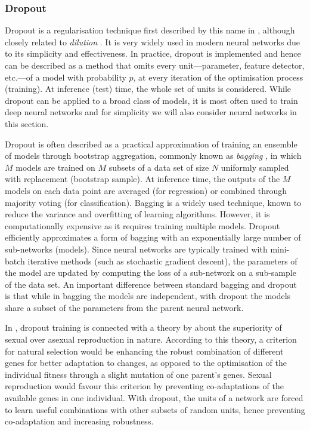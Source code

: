 {\subsubsection{Dropout}
\label{sec:background-dropout}
Dropout is a regularisation technique first described by this name in \citep{hinton2012dropout, srivastava2014dropout}, although closely related to \textit{dilution} \citep{hertz1991dilution}. It is very widely used in modern neural networks due to its simplicity and effectiveness. In practice, dropout is implemented and hence can be described as a method that omits every unit---parameter, feature detector, etc.---of a model with probability $p$, at every iteration of the optimisation process (training). At inference (test) time, the whole set of units is considered. While dropout can be applied to a broad class of models, it is most often used to train deep neural networks and for simplicity we will also consider neural networks in this section.

Dropout is often described as a practical approximation of training an ensemble of models through bootstrap aggregation, commonly known as \textit{bagging} \citep{breiman1994bagging}, in which $M$ models are trained on $M$ subsets of a data set of size $N$ uniformly sampled with replacement (bootstrap sample). At inference time, the outputs of the $M$ models on each data point are averaged (for regression) or combined through majority voting (for classification). Bagging is a widely used technique, known to reduce the variance and overfitting of learning algorithms. However, it is computationally expensive as it requires training multiple models. Dropout efficiently approximates a form of bagging with an exponentially large number of sub-networks (models). Since neural networks are typically trained with mini-batch iterative methods (such as stochastic gradient descent), the parameters of the model are updated by computing the loss of a sub-network on a sub-sample of the data set. An important difference between standard bagging and dropout is that while in bagging the models are independent, with dropout the models share a subset of the parameters from the parent neural network.

In \citep{srivastava2014dropout}, dropout training is connected with a theory by \citet{livnat2010sex} about the superiority of sexual over asexual reproduction in nature. According to this theory, a criterion for natural selection would be enhancing the robust combination of different genes for better adaptation to changes, as opposed to the optimisation of the individual fitness through a slight mutation of one parent's genes. Sexual reproduction would favour this criterion by preventing co-adaptations of the available genes in one individual. With dropout, the units of a network are forced to learn useful combinations with other subsets of random units, hence preventing co-adaptation and increasing robustness.

}
